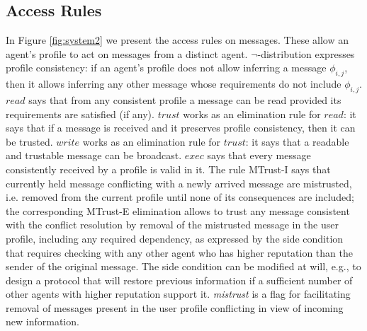 \documentclass[compsoc, conference, letterpaper, 10pt, times]{IEEEtran}
\begin{document}
\subsection{Access Rules}

In Figure \ref{fig:system2} we present the access rules on messages. These allow an agent's profile to act on messages from a distinct agent. $\neg$-distribution expresses profile consistency: if an agent's profile does not allow inferring a message $\phi_{i,j}$, then it allows inferring any other message whose requirements do not include $\phi_{i,j}$. $\mathit{read}$ says that from any consistent profile a message can be read provided its requirements are satisfied (if any). $\mathit{trust}$ works as an elimination rule for $read$: it says that if a message is received and it preserves profile consistency, then it can be trusted. $\mathit{write}$ works as an elimination rule for $trust$: it says that a readable and trustable message can be broadcast. $\mathit{exec}$ says that every message consistently received by a profile is valid in it. The rule MTrust-I says that currently held message conflicting with a newly arrived message are mistrusted, i.e. removed from the current profile until none of its consequences are included; the corresponding MTrust-E elimination allows to trust any message consistent with the conflict resolution by removal of the mistrusted message in the user profile, including any required dependency, as expressed by the side condition that requires checking with any other agent who has higher reputation than the sender of the original message. The side condition can be modified at will, e.g., to design a protocol that will restore previous information if a sufficient number of other agents with higher reputation support it. \textit{mistrust} is a flag for facilitating removal of messages present in the user profile conflicting in view of incoming new information. 
\end{document}
